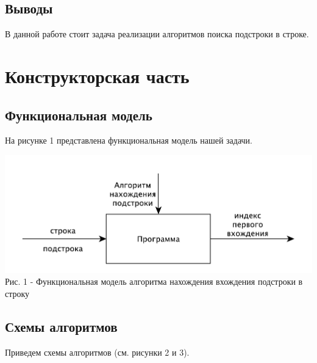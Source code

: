 \documentclass[a4paper,14pt]{article} %
\begin{document}
        \subsection{Выводы} 
        \hfill
        
        В данной работе стоит задача реализации алгоритмов поиска подстроки в строке. 


	\newpage

	\section{Конструкторская часть}
	\hfill

		
	\subsection{Функциональная модель}
	
	На рисунке 1 представлена функциональная модель нашей задачи.  
	
	\begin{center}
		\includegraphics[scale = 0.8]{idef0} \\ Рис.  1 - Функциональная модель алгоритма нахождения вхождения подстроки в строку 
	\end{center}
	        
        \subsection{Схемы алгоритмов}
        \hfill
        
         Приведем схемы алгоритмов (см. рисунки 2 и 3). 
	
\end{document}
